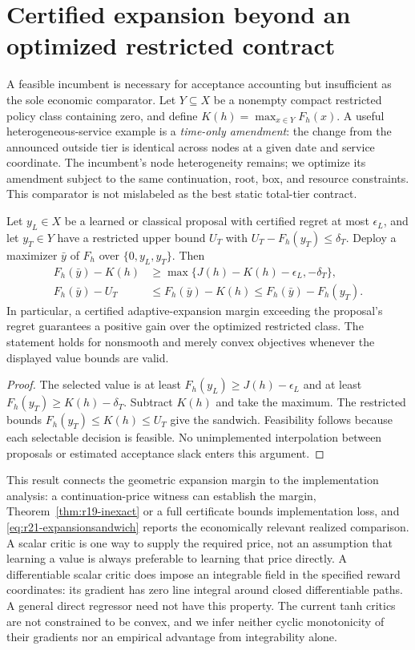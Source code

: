 \section{Certified expansion beyond an optimized restricted contract}\label{sec:r21-benchmark}
A feasible incumbent is necessary for acceptance accounting but insufficient as the sole economic comparator. Let $Y\subseteq X$ be a nonempty compact restricted policy class containing zero, and define $K(h)=\max_{x\in Y}F_h(x)$. A useful heterogeneous-service example is a \emph{time-only amendment}: the change from the announced outside tier is identical across nodes at a given date and service coordinate. The incumbent's node heterogeneity remains; we optimize its amendment subject to the same continuation, root, box, and resource constraints. This comparator is not mislabeled as the best static total-tier contract.

\begin{theorem}\label{thm:r21-expansion}
Let $y_L\in X$ be a learned or classical proposal with certified regret at most $\epsilon_L$, and let $y_T\in Y$ have a restricted upper bound $U_T$ with $U_T-F_h(y_T)\leq\delta_T$. Deploy a maximizer $\bar y$ of $F_h$ over $\{0,y_L,y_T\}$. Then
\begin{align}
 F_h(\bar y)-K(h)&\geq\max\{J(h)-K(h)-\epsilon_L,-\delta_T\},\label{eq:r21-expansion}\\
 F_h(\bar y)-U_T&\leq F_h(\bar y)-K(h)
 \leq F_h(\bar y)-F_h(y_T).\label{eq:r21-expansionsandwich}
\end{align}
In particular, a certified adaptive-expansion margin exceeding the proposal's regret guarantees a positive gain over the optimized restricted class. The statement holds for nonsmooth and merely convex objectives whenever the displayed value bounds are valid.
\end{theorem}
\begin{proof}
The selected value is at least $F_h(y_L)\geq J(h)-\epsilon_L$ and at least $F_h(y_T)\geq K(h)-\delta_T$. Subtract $K(h)$ and take the maximum. The restricted bounds $F_h(y_T)\leq K(h)\leq U_T$ give the sandwich. Feasibility follows because each selectable decision is feasible. No unimplemented interpolation between proposals or estimated acceptance slack enters this argument.
\end{proof}
This result connects the geometric expansion margin to the implementation analysis: a continuation-price witness can establish the margin, Theorem~\ref{thm:r19-inexact} or a full certificate bounds implementation loss, and \eqref{eq:r21-expansionsandwich} reports the economically relevant realized comparison. A scalar critic is one way to supply the required price, not an assumption that learning a value is always preferable to learning that price directly. A differentiable scalar critic does impose an integrable field in the specified reward coordinates: its gradient has zero line integral around closed differentiable paths. A general direct regressor need not have this property. The current tanh critics are not constrained to be convex, and we infer neither cyclic monotonicity of their gradients nor an empirical advantage from integrability alone.

